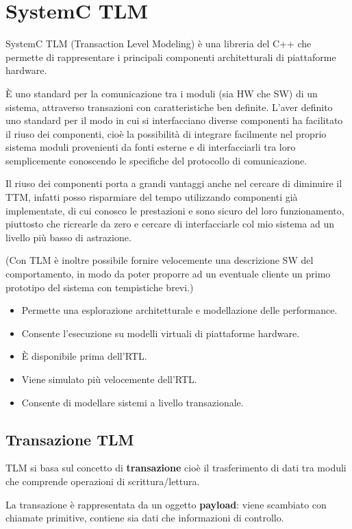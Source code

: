 \documentclass[a4paper]{article}
\begin{document}
	
	\section{SystemC TLM}
		SystemC TLM (Transaction Level Modeling) è una libreria del C++ che permette di rappresentare i principali componenti architetturali di piattaforme hardware. 
		
		È uno standard per la comunicazione tra i moduli (sia HW che SW) di un sistema, attraverso transazioni con caratteristiche ben definite. L'aver definito uno standard per il modo in cui si interfacciano diverse componenti ha facilitato il riuso dei componenti, cioè la possibilità di integrare facilmente nel proprio sistema moduli provenienti da fonti esterne e di interfacciarli tra loro semplicemente conoscendo le specifiche del protocollo di comunicazione.
		
		Il riuso dei componenti porta a grandi vantaggi anche nel cercare di diminuire il TTM, infatti posso risparmiare del tempo utilizzando componenti già implementate, di cui conosco le prestazioni e sono sicuro del loro funzionamento, piuttosto che ricrearle da zero e cercare di interfacciarle col mio sistema ad un livello più basso di astrazione.
		
		(Con TLM è inoltre possibile fornire velocemente una descrizione SW del comportamento, in modo da poter proporre ad un eventuale cliente un primo prototipo del sistema con tempistiche brevi.)
		
		\begin{itemize}
			\item Permette una esplorazione architetturale e modellazione delle performance.
			\item Consente l'esecuzione su modelli virtuali di piattaforme hardware.
			\item È disponibile prima dell'RTL.
			\item Viene simulato più velocemente dell'RTL.
			\item Consente di modellare sistemi a livello transazionale.
		\end{itemize}
		
		\subsection{Transazione TLM}
			TLM si basa sul concetto di \textbf{transazione} cioè il trasferimento di dati tra moduli che comprende operazioni di scrittura/lettura. 
			
			\noindent
			La transazione è rappresentata da un oggetto \textbf{payload}: viene scambiato con chiamate primitive, contiene sia dati che informazioni di controllo.
			
\end{document}
